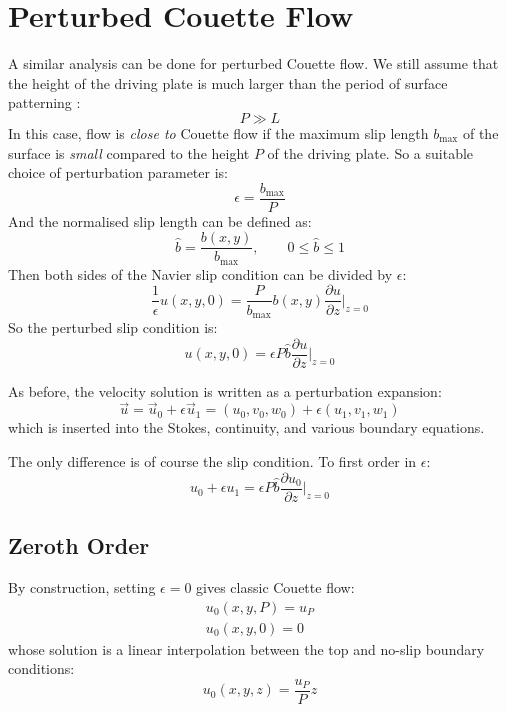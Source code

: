 \documentclass[12pt, a4paper, twoside, openright]{book}
\newcommand{\bmax}{\ensuremath{b_{\mathrm{max}}}}
\begin{document}
\clearpage
\section{Perturbed Couette Flow}

A similar analysis can be done for perturbed Couette flow.  We still assume that the height of the driving plate is much larger than the period of surface patterning :
\begin{equation}
P \gg L
\end{equation}
In this case, flow is \emph{close to} Couette flow if the maximum slip length $\bmax$ of the surface is \emph{small} compared to the height $P$ of the driving plate.  So a suitable choice of perturbation parameter is:
\begin{equation}
\epsilon = \frac{\bmax}{P}
\end{equation} 
And the normalised slip length can be defined as:
\begin{equation}
\hat{b} = \frac{b(x,y)}{\bmax}, \qquad 0 \leq \hat{b} \leq 1
\end{equation}
Then both sides of the Navier slip condition can be divided by $\epsilon$:
\begin{equation}
\frac{1}{\epsilon} u(x,y,0) = \frac{P}{\bmax} b(x,y) \frac{\partial u}{\partial z} \rvert_{z=0}
\end{equation}
So the perturbed slip condition is:
\begin{equation}
u(x,y,0) = \epsilon P \hat{b} \frac{\partial u}{\partial z} \rvert_{z=0}
\end{equation}

As before, the velocity solution is written as a perturbation expansion:
\begin{equation}
\vec{u} = \vec{u}_0 + \epsilon \vec{u}_1 = (u_0, v_0, w_0) + \epsilon(u_1, v_1, w_1)
\end{equation}
which is inserted into the Stokes, continuity, and various boundary equations.

The only difference is of course the slip condition.  To first order in $\epsilon$:
\begin{equation}
u_0 + \epsilon u_1 = \epsilon P \hat{b} \frac{\partial u_0}{\partial z} \rvert_{z=0}
\end{equation}

\subsection{Zeroth Order}

By construction, setting $\epsilon = 0$ gives classic Couette flow:
\begin{gather}
u_0(x,y,P) = u_P \\
u_0(x,y,0) = 0
\end{gather}
whose solution is a linear interpolation between the top and no-slip boundary conditions:
\begin{equation}
u_0(x,y,z) = \frac{u_P}{P} z
\end{equation}
\end{document}
